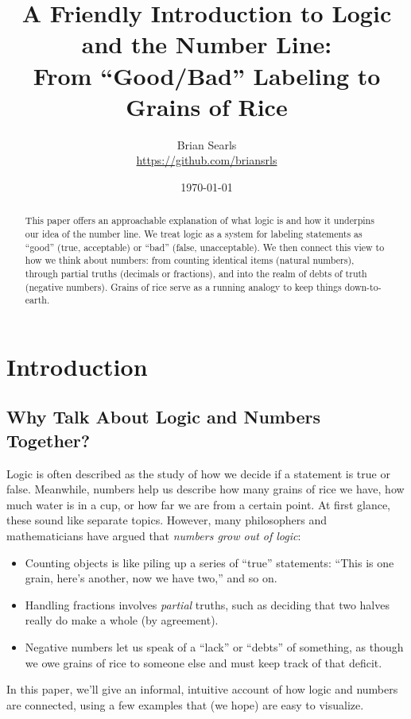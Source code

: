 \documentclass[12pt]{article}
\title{A Friendly Introduction to Logic and the Number Line:\\
From ``Good/Bad'' Labeling to Grains of Rice}
\author{Brian Searls\\\href{https://github.com/briansrls}{https://github.com/briansrls}}
\date{\today}
\begin{document}
\maketitle

\begin{abstract}
This paper offers an approachable explanation of what logic is and how
it underpins our idea of the number line. We treat logic as a system
for labeling statements as ``good'' (true, acceptable) or ``bad''
(false, unacceptable). We then connect this view to how we think about
numbers: from counting identical items (natural numbers), through
partial truths (decimals or fractions), and into the realm of debts
of truth (negative numbers). Grains of rice serve as a running analogy
to keep things down-to-earth.
\end{abstract}

\tableofcontents

\section{Introduction}
\label{sec:intro}

\subsection{Why Talk About Logic and Numbers Together?}
Logic is often described as the study of how we decide if a statement is
true or false. Meanwhile, numbers help us describe how many grains of rice
we have, how much water is in a cup, or how far we are from a certain point.
At first glance, these sound like separate topics. However, many philosophers
and mathematicians have argued that \emph{numbers grow out of logic}:
\begin{itemize}
  \item Counting objects is like piling up a series of ``true'' statements:
  ``This is one grain, here's another, now we have two,'' and so on.
  \item Handling fractions involves \emph{partial} truths, such as deciding
  that two halves really do make a whole (by agreement).
  \item Negative numbers let us speak of a ``lack'' or ``debts'' of something,
  as though we owe grains of rice to someone else and must keep track of that
  deficit.
\end{itemize}

In this paper, we'll give an informal, intuitive account of how logic and
numbers are connected, using a few examples that (we hope) are easy to visualize.
\end{document}
